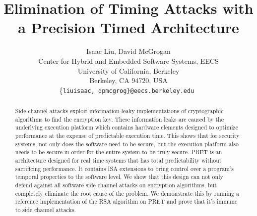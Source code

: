 \documentclass[times, 10pt,twocolumn]{article}
\begin{document}
  \title{Elimination of Timing Attacks with a Precision Timed Architecture}

  \author{Isaac Liu, David McGrogan \\
    Center for Hybrid and Embedded Software Systems, EECS \\
    University of California, Berkeley \\
    Berkeley, CA 94720, USA \\
    \{\tt liuisaac, dpmcgrog\}@eecs.berkeley.edu
  }


\maketitle
\thispagestyle{empty}

\begin{abstract}
Side-channel attacks exploit information-leaky implementations of cryptographic algorithms to find the encryption key. These information leaks are caused by the underlying execution platform which contains hardware elements designed to optimize performance at the expense of predictable execution time. This shows that for security systems, not only does the software need to be secure, but the execution platform also needs to be secure in order for the entire system to be truly secure. PRET is an architecture designed for real time systems that has total predictability without sacrificing performance. It contains ISA extensions to bring control over a program's temporal properties to the software level. We show that this design can not only defend against all software side channel attacks on encryption algorithms, but completely eliminate the root cause of the problem. We demonstrate this by running a reference implementation of the RSA algorithm on PRET and prove that it's immune to side channel attacks.
\end{abstract}


\end{document}
